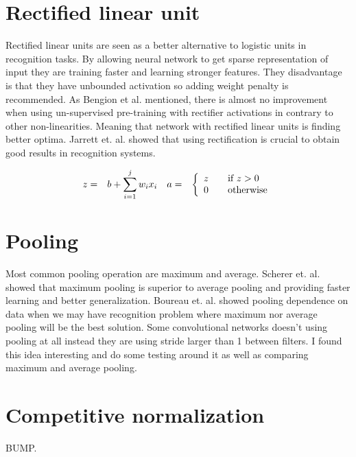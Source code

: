 \section{Rectified linear unit}

Rectified linear units are seen as a better alternative to logistic units in recognition tasks. By allowing neural network to get sparse representation of input they are training faster and learning stronger features. They disadvantage is that they have unbounded activation so adding weight penalty is recommended. As Bengion et al. mentioned, there is almost no improvement when using un-supervised pre-training with rectifier activations in contrary to other non-linearities. Meaning that network with rectified linear units is finding better optima. Jarrett et. al. showed that using rectification is crucial to obtain good results in recognition systems. 

\begin{equation}
\begin{aligned}
z &=& b + \sum\limits_{i=1}^j w_i x_i \quad
a &=& \left\{
  \begin{array}{l l}
    z & \quad \text{if \(z > 0\)}\\
    0 & \quad \text{otherwise} 
  \end{array} \right.
\end{aligned}
\end{equation}

\section{Pooling}

Most common pooling operation are maximum and average. Scherer et. al. showed that maximum pooling is superior to average pooling and providing faster learning and better generalization. Boureau et. al. showed pooling dependence on data when we may have recognition problem where maximum nor average pooling will be the best solution. Some convolutional networks doesn't using pooling at all instead they are using stride larger than 1 between filters. I found this idea interesting and do some testing around it as well as comparing maximum and average pooling.

\section{Competitive normalization}
 BUMP.

